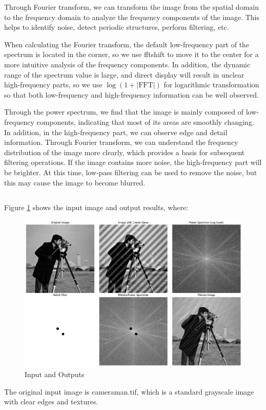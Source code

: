 \documentclass[12pt]{article}
\begin{document}
Through Fourier transform, we can transform the image from the spatial domain to the frequency domain to analyze the frequency components of the image. This helps to identify noise, detect periodic structures, perform filtering, etc.

When calculating the Fourier transform, the default low-frequency part of the spectrum is located in the corner, so we use fftshift to move it to the center for a more intuitive analysis of the frequency components. In addition, the dynamic range of the spectrum value is large, and direct display will result in unclear high-frequency parts, so we use $\log(1 + |\text{FFT}|) $ for logarithmic transformation so that both low-frequency and high-frequency information can be well observed.

Through the power spectrum, we find that the image is mainly composed of low-frequency components, indicating that most of its areas are smoothly changing. In addition, in the high-frequency part, we can observe edge and detail information. Through Fourier transform, we can understand the frequency distribution of the image more clearly, which provides a basis for subsequent filtering operations. If the image contains more noise, the high-frequency part will be brighter. At this time, low-pass filtering can be used to remove the noise, but this may cause the image to become blurred.

\subsection{}
Figure \ref{fig:3.2} shows the input image and output results, where:

\begin{figure}[ht]
        \centering
      \includegraphics[width=1.0\columnwidth, keepaspectratio]{pics/a3-3.2.png}
        \caption[]{Input and Outputs}
    \label{fig:3.2}
    \end{figure}
The original input image is cameraman.tif, which is a standard grayscale image with clear edges and textures.
\end{document}
